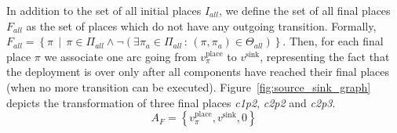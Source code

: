 In addition to the set of all initial places $I_{all}$, we define
the set of all final places $F_{all}$ as the set of places which
do not have any outgoing transition. Formally,
$F_{all}=\left\{ \pi\,\mid\,\pi\in\Pi_{all}\land\lnot\left(\exists\pi_{a}\in\Pi_{all}\,:\,\left(\pi,\pi_{a}\right)\in\Theta_{all}\right)\right\} $.
Then, for each final place $\pi$ we associate one arc going from
$v_\pi^\text{place}$ to $v^\text{sink}$, representing the fact that the
deployment is over only after all components have reached their final places
(\ie when no more transition can be executed).
Figure~\ref{fig:source_sink_graph} depicts the transformation of three final
places \emph{c1p2}, \emph{c2p2} and \emph{c2p3}.
\[
A_{F}=\left\{ v_\pi^\text{place},v^\text{sink},0\right\} 
\]

\begin{figure}[h]
  \hfill
\end{figure}
